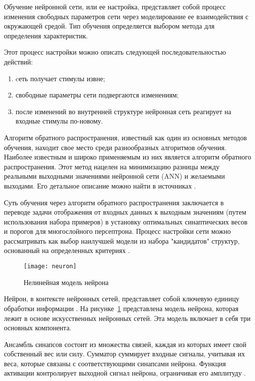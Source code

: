 Обучение нейронной сети, или ее настройка, представляет собой процесс изменения свободных параметров сети через моделирование ее взаимодействия с окружающей средой. Тип обучения определяется выбором метода для определения характеристик.

Этот процесс настройки можно описать следующей последовательностью действий:
\begin{enumerate}
    \item cеть получает стимулы извне;
    \item свободные параметры сети подвергаются изменениям;
    \item после изменений во внутренней структуре нейронная сеть реагирует на входные стимулы по-новому.
\end{enumerate}

Алгоритм обратного распространения, известный как один из основных методов обучения, находит свое место среди разнообразных алгоритмов обучения. Наиболее известным и широко применяемым из них является алгоритм обратного распространения. Этот метод нацелен на минимизацию разницы между реальными выходными значениями нейронной сети (ANN) и желаемыми выходами. Его детальное описание можно найти в источниках .

Суть обучения через алгоритм обратного распространения заключается в переводе задачи отображения от входных данных к выходным значениям (путем использования набора примеров) в установку оптимальных синаптических весов и порогов для многослойного персептрона. Процесс настройки сети можно рассматривать как выбор наилучшей модели из набора "кандидатов" структур, основанный на определенных критериях .

\begin{figure}[h!]
    \centering
    \vspace{\toppaddingoffigure}
    \texttt{[image: neuron]}
    \caption{Нелинейная модель нейрона}
    \label{f:neuron}
\end{figure}

Нейрон, в контексте нейронных сетей, представляет собой ключевую единицу обработки информации . На рисунке~\ref{f:neuron} представлена модель нейрона, которая лежит в основе искусственных нейронных сетей. Эта модель включает в себя три основных компонента.

Ансамбль синапсов состоит из множества связей, каждая из которых имеет свой собственный вес или силу. Сумматор суммирует входные сигналы, учитывая их веса, которые связаны с соответствующими синапсами нейрона. Функция активации контролирует выходной сигнал нейрона, ограничивая его амплитуду .

